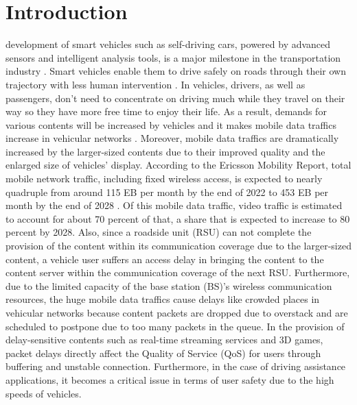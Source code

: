\documentclass{ieeeaccess}
\begin{document}
\titlepgskip=-15pt

\maketitle

\section{Introduction} \label{sec:introduction}
 development of smart vehicles such as self-driving cars, powered by advanced sensors and intelligent analysis tools, is a major milestone in the transportation industry \cite{Zhe2020}.
Smart vehicles enable them to drive safely on roads through their own trajectory with less human intervention \cite{yuan2018}.
In vehicles, drivers, as well as passengers, don't need to concentrate on driving much while they travel on their way so they have more free time to enjoy their life.
As a result, demands for various contents will be increased by vehicles and it makes mobile data traffics increase in vehicular networks \cite{Kumer2013, Pranav2019, Reichardt2002, Yen2020}.
Moreover, mobile data traffics are dramatically increased by the larger-sized contents due to their improved quality and the enlarged size of vehicles' display.
According to the Ericsson Mobility Report, total mobile network traffic, including fixed wireless access, is expected to nearly quadruple from around 115 EB per month by the end of 2022 to 453 EB per month by the end of 2028 \cite{Ericsson}.
Of this mobile data traffic, video traffic is estimated to account for about 70 percent of that, a share that is expected to increase to 80 percent by 2028.
Also, since a roadside unit (RSU) can not complete the provision of the content within its communication coverage due to the larger-sized content, a vehicle user suffers an access delay in bringing the content to the content server within the communication coverage of the next RSU.
Furthermore, due to the limited capacity of the base station (BS)'s wireless communication resources, the huge mobile data traffics cause delays like crowded places in vehicular networks because content packets are dropped due to overstack and are scheduled to postpone due to too many packets in the queue.
In the provision of delay-sensitive contents such as real-time streaming services and 3D games, packet delays directly affect the Quality of Service (QoS) for users through buffering and unstable connection.
Furthermore, in the case of driving assistance applications, it becomes a critical issue in terms of user safety due to the high speeds of vehicles.
\end{document}
